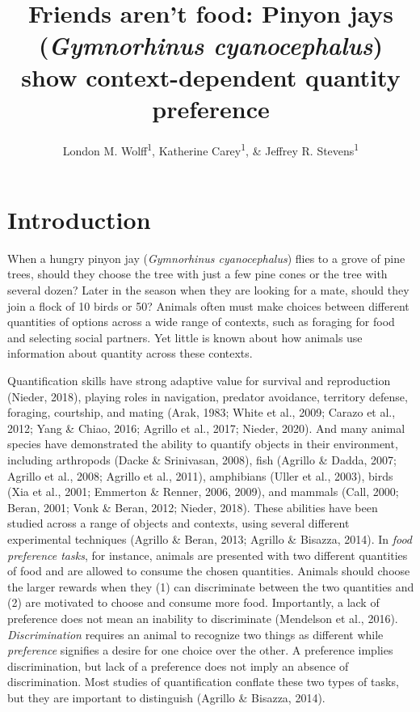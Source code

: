\documentclass[
  ,pub,floatsintext]{apa6}
\title{Friends aren't food: Pinyon jays (\emph{Gymnorhinus cyanocephalus}) show context-dependent quantity preference}
\author{London M. Wolff\textsuperscript{1}, Katherine Carey\textsuperscript{1}, \& Jeffrey R. Stevens\textsuperscript{1}}
\date{}
\affiliation{\vspace{0.5cm}\textsuperscript{1} Department of Psychology, Center for Brain, Biology \& Behavior, University of Nebraska-Lincoln, Lincoln, NE, USA}
\begin{document}
\maketitle

\hypertarget{introduction}{%
\section{Introduction}\label{introduction}}

When a hungry pinyon jay (\emph{Gymnorhinus cyanocephalus}) flies to a grove of pine trees, should they choose the tree with just a few pine cones or the tree with several dozen? Later in the season when they are looking for a mate, should they join a flock of 10 birds or 50? Animals often must make choices between different quantities of options across a wide range of contexts, such as foraging for food and selecting social partners. Yet little is known about how animals use information about quantity across these contexts.

Quantification skills have strong adaptive value for survival and reproduction (Nieder, 2018), playing roles in navigation, predator avoidance, territory defense, foraging, courtship, and mating (Arak, 1983; White et al., 2009; Carazo et al., 2012; Yang \& Chiao, 2016; Agrillo et al., 2017; Nieder, 2020). And many animal species have demonstrated the ability to quantify objects in their environment, including arthropods (Dacke \& Srinivasan, 2008), fish (Agrillo \& Dadda, 2007; Agrillo et al., 2008; Agrillo et al., 2011), amphibians (Uller et al., 2003), birds (Xia et al., 2001; Emmerton \& Renner, 2006, 2009), and mammals (Call, 2000; Beran, 2001; Vonk \& Beran, 2012; Nieder, 2018). These abilities have been studied across a range of objects and contexts, using several different experimental techniques (Agrillo \& Beran, 2013; Agrillo \& Bisazza, 2014). In \emph{food preference tasks}, for instance, animals are presented with two different quantities of food and are allowed to consume the chosen quantities. Animals should choose the larger rewards when they (1) can discriminate between the two quantities and (2) are motivated to choose and consume more food. Importantly, a lack of preference does not mean an inability to discriminate (Mendelson et al., 2016). \emph{Discrimination} requires an animal to recognize two things as different while \emph{preference} signifies a desire for one choice over the other. A preference implies discrimination, but lack of a preference does not imply an absence of discrimination. Most studies of quantification conflate these two types of tasks, but they are important to distinguish (Agrillo \& Bisazza, 2014).
\end{document}
